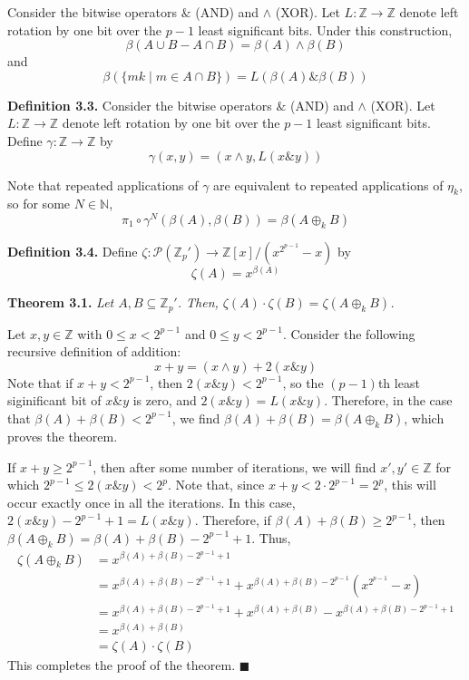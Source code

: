 \documentclass{article}
\newcommand{\zee}{\mathbb{Z}}
\newcommand{\N}{\mathbb{N}}
\begin{document}
Consider the bitwise operators $\&$ (AND) and $\wedge$ (XOR).
Let $L: \zee \rightarrow \zee$ denote left rotation by one bit
over the $p-1$ least significant bits.
Under this construction,
\[\beta(A \cup B - A \cap B) = \beta(A) \wedge \beta(B)\]
and
\[\beta(\{mk \mid m \in A \cap B\}) = L(\beta(A) \mathbin{\&} \beta(B))\]

\textbf{Definition 3.3.} Consider the bitwise operators $\&$ (AND)
and $\wedge$ (XOR).
Let $L: \zee \rightarrow \zee$ denote left rotation by one bit
over the $p-1$ least significant bits.
Define $\gamma: \zee \rightarrow \zee$
by
\[\gamma(x, y) = (x \wedge y, L(x \mathbin{\&} y))\]

Note that repeated applications of $\gamma$ are equivalent to
repeated applications of $\eta_k$, so for some $N \in \N$,
\[\pi_1 \circ \gamma^N(\beta(A), \beta(B)) = \beta(A \oplus_k B)\]

\textbf{Definition 3.4.} Define $\zeta: \mathcal{P}(\zee_p')
\rightarrow \zee[x]/(x^{2^{p-1}}-x)$ by
\[\zeta(A) = x^{\beta(A)}\]

\newpage
\textbf{Theorem 3.1.} \textit{Let $A, B \subseteq \zee_p'$.
Then, $\zeta(A) \cdot \zeta(B) = \zeta(A \oplus_k B)$.}

Let $x, y \in \zee$ with $0 \leq x < 2^{p-1}$
and $0 \leq y < 2^{p-1}$.
Consider the following recursive definition of addition:
\[x + y = (x \wedge y) + 2(x \mathbin{\&} y)\]
Note that if $x + y < 2^{p-1}$, then
$2(x \mathbin{\&} y) < 2^{p-1}$, so the $(p-1)$th
least siginificant bit of $x \mathbin{\&} y$ is zero,
and $2(x \mathbin{\&} y) = L(x \mathbin{\&} y)$.
Therefore, in the case that $\beta(A) + \beta(B) < 2^{p-1}$,
we find
$\beta(A) + \beta(B) = \beta(A \oplus_k B)$,
which proves the theorem.

If $x + y \geq 2^{p-1}$, then after some number of iterations,
we will find $x', y' \in \zee$ for which
$2^{p-1} \leq 2(x \mathbin{\&} y) < 2^p$.
Note that, since $x + y < 2 \cdot 2^{p-1} = 2^p$, this will occur exactly
once in all the iterations. In this case,
$2(x \mathbin{\&} y) - 2^{p-1} + 1 = L(x \mathbin{\&} y)$.
Therefore, if $\beta(A) + \beta(B) \geq 2^{p-1}$, then
$\beta(A \oplus_k B) = \beta(A) + \beta(B) - 2^{p-1} + 1$.
Thus,
\[\begin{split}
    \zeta(A \oplus_k B) &= x^{\beta(A) + \beta(B) - 2^{p-1} + 1} \\
    &= x^{\beta(A) + \beta(B) - 2^{p-1} + 1} +
        x^{\beta(A) + \beta(B) - 2^{p-1}}(x^{2^{p-1}} - x) \\
    &= x^{\beta(A) + \beta(B) - 2^{p-1} + 1} +
        x^{\beta(A) + \beta(B)} - x^{\beta(A) + \beta(B) - 2^{p-1} + 1} \\
    &= x^{\beta(A) + \beta(B)} \\
    &= \zeta(A) \cdot \zeta(B)
\end{split}\]
This completes the proof of the theorem. $\blacksquare$
\end{document}
